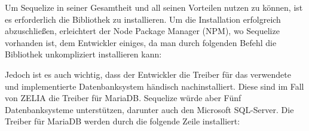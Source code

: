 
Um Sequelize in seiner Gesamtheit und all seinen Vorteilen nutzen zu können, ist es erforderlich die Bibliothek zu installieren. Um die Installation erfolgreich abzuschließen, erleichtert der Node Package Manager (NPM), wo Sequelize vorhanden ist, dem Entwickler einiges, da man durch folgenden Befehl die Bibliothek unkompliziert installieren kann:


\cite{Sequelize}

Jedoch ist es auch wichtig, dass der Entwickler die Treiber für das verwendete und implementierte Datenbanksystem händisch nachinstalliert. Diese sind im Fall von ZELIA die Treiber für MariaDB. Sequelize würde aber Fünf Datenbanksysteme unterstützen, darunter auch den Microsoft SQL-Server. Die Treiber für MariaDB werden durch die folgende Zeile installiert:


\cite{SequInstall}
